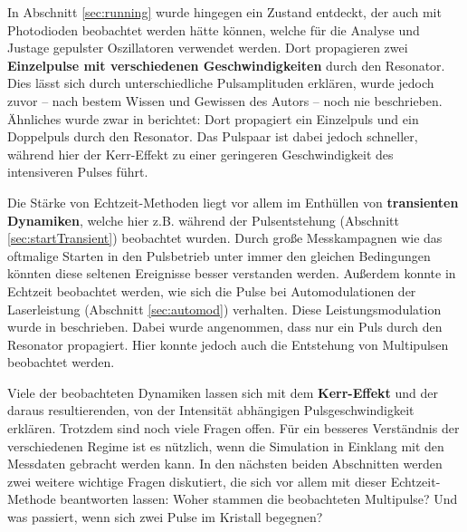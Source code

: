 \documentclass[bachelor,       %
               twoside,        %
               BCOR10mm,       %
               liststotoc,nomtotoc,bibtotoc, %
               english,ngerman, %
               final,          %
               ]{GAUBM}
\begin{document}
In Abschnitt \ref{sec:running} wurde hingegen ein Zustand entdeckt, der auch mit Photodioden beobachtet werden hätte können, welche für die Analyse und Justage gepulster Oszillatoren verwendet werden.
Dort propagieren zwei \textbf{Einzelpulse mit verschiedenen Geschwindigkeiten} durch den Resonator.
Dies lässt sich durch unterschiedliche Pulsamplituden erklären, wurde jedoch zuvor -- nach bestem Wissen und Gewissen des Autors -- noch nie beschrieben.
Ähnliches wurde zwar in \cite{grelu_group_2004} berichtet:
Dort propagiert ein Einzelpuls und ein Doppelpuls durch den Resonator.
Das Pulspaar ist dabei jedoch schneller, während hier der Kerr-Effekt zu einer geringeren Geschwindigkeit des intensiveren Pulses führt.

Die Stärke von Echtzeit-Methoden liegt vor allem im Enthüllen von \textbf{transienten Dynamiken}, welche hier z.B. während der Pulsentstehung (Abschnitt \ref{sec:startTransient}) beobachtet wurden.
Durch große Messkampagnen wie das oftmalige Starten in den Pulsbetrieb unter immer den gleichen Bedingungen könnten diese seltenen Ereignisse besser verstanden werden.
Außerdem konnte in Echtzeit beobachtet werden, wie sich die Pulse bei Automodulationen der Laserleistung (Abschnitt \ref{sec:automod}) verhalten. 
Diese Leistungsmodulation wurde in \cite{jasapara_automodulations_2000} beschrieben.
Dabei wurde angenommen, dass nur ein Puls durch den Resonator propagiert.
Hier konnte jedoch auch die Entstehung von Multipulsen beobachtet werden.

Viele der beobachteten Dynamiken lassen sich mit dem \textbf{Kerr-Effekt} und der daraus resultierenden, von der Intensität abhängigen Pulsgeschwindigkeit erklären.
Trotzdem sind noch viele Fragen offen.
Für ein besseres Verständnis der verschiedenen Regime ist es nützlich, wenn die Simulation in Einklang mit den Messdaten gebracht werden kann.
In den nächsten beiden Abschnitten werden zwei weitere wichtige Fragen diskutiert, die sich vor allem mit dieser Echtzeit-Methode beantworten lassen:
Woher stammen die beobachteten Multipulse? Und was passiert, wenn sich zwei Pulse im Kristall begegnen?
\end{document}
